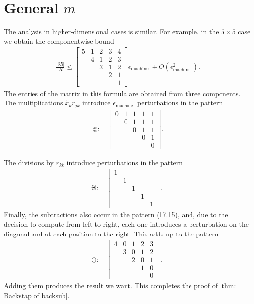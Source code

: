 \section{General $m$} 
The analysis in higher-dimensional cases is similar. For example, in the $5 \times 5$ case we obtain the componentwise bound
\begin{align*}
\frac{|\delta R|}{|R|} \leq\left[\begin{array}{lllll}
5 & 1 & 2 & 3 & 4 \\
& 4 & 1 & 2 & 3 \\
& & 3 & 1 & 2 \\
& & & 2 & 1 \\
& & & & 1
\end{array}\right] \epsilon_{\text {machine }}+O\left(\epsilon_{\text {machine }}^2\right) .
\end{align*}
The entries of the matrix in this formula are obtained from three components. The multiplications $\tilde{x}_k r_{j k}$ introduce $\epsilon_{\text {machine }}$ perturbations in the pattern
\begin{align*}
\otimes: \quad \left[\begin{array}{lllll}
0 & 1 & 1 & 1 & 1 \\
& 0 & 1 & 1 & 1 \\
& & 0 & 1 & 1 \\
& & & 0 & 1 \\
& & & & 0
\end{array}\right] .
\end{align*}

The divisions by $r_{k k}$ introduce perturbations in the pattern
\begin{align*}
\odiv: \quad\left[\begin{array}{lllll}
1 & & & & \\
& 1 & & & \\
& & 1 & & \\
& & & 1 & \\
& & & & 1
\end{array}\right] \text {. }
\end{align*}
Finally, the subtractions also occur in the pattern (17.15), and, due to the decision to compute from left to right, each one introduces a perturbation on the diagonal and at each position to the right. This adds up to the pattern
\begin{align*}
\ominus: \quad\left[\begin{array}{lllll}
4 & 0 & 1 & 2 & 3 \\
& 3 & 0 & 1 & 2 \\
& & 2 & 0 & 1 \\
& & & 1 & 0 \\
& & & & 0
\end{array}\right] \text {. }
\end{align*}
Adding them produces the result we want. This completes the proof of \autoref{thm: Backstap of backsub}.











